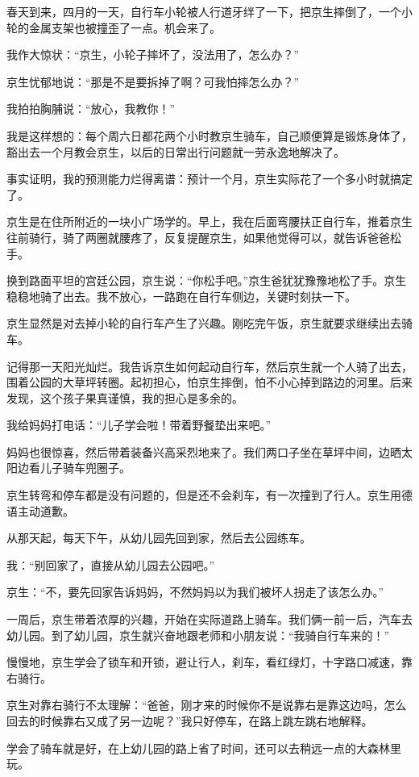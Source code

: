 \documentclass[twoside,openright,headings=optiontohead]{ctexbook} %
\begin{document}
{春天到来，四月的一天，自行车小轮被人行道牙绊了一下，把京生摔倒了，一个小轮的金属支架也被撞歪了一点。机会来了。

我作大惊状：``京生，小轮子摔坏了，没法用了，怎么办？''

京生忧郁地说：``那是不是要拆掉了啊？可我怕摔怎么办？''

我拍拍胸脯说：``放心，我教你！''

我是这样想的：每个周六日都花两个小时教京生骑车，自己顺便算是锻炼身体了，豁出去一个月教会京生，以后的日常出行问题就一劳永逸地解决了。

事实证明，我的预测能力烂得离谱：预计一个月，京生实际花了一个多小时就搞定了。

京生是在住所附近的一块小广场学的。早上，我在后面弯腰扶正自行车，推着京生往前骑行，骑了两圈就腰疼了，反复提醒京生，如果他觉得可以，就告诉爸爸松手。

换到路面平坦的宫廷公园，京生说：``你松手吧。''京生爸犹犹豫豫地松了手。京生稳稳地骑了出去。我不放心，一路跑在自行车侧边，关键时刻扶一下。

京生显然是对去掉小轮的自行车产生了兴趣。刚吃完午饭，京生就要求继续出去骑车。

记得那一天阳光灿烂。我告诉京生如何起动自行车，然后京生就一个人骑了出去，围着公园的大草坪转圈。起初担心，怕京生摔倒，怕不小心掉到路边的河里。后来发现，这个孩子果真谨慎，我的担心是多余的。

我给妈妈打电话：``儿子学会啦！带着野餐垫出来吧。''

妈妈也很惊喜，然后带着装备兴高采烈地来了。我们两口子坐在草坪中间，边晒太阳边看儿子骑车兜圈子。

京生转弯和停车都是没有问题的，但是还不会刹车，有一次撞到了行人。京生用德语主动道歉。

从那天起，每天下午，从幼儿园先回到家，然后去公园练车。

我：``别回家了，直接从幼儿园去公园吧。''

京生：``不，要先回家告诉妈妈，不然妈妈以为我们被坏人拐走了该怎么办。''

一周后，京生带着浓厚的兴趣，开始在实际道路上骑车。我们俩一前一后，汽车去幼儿园。到了幼儿园，京生就兴奋地跟老师和小朋友说：``我骑自行车来的！''

慢慢地，京生学会了锁车和开锁，避让行人，刹车，看红绿灯，十字路口减速，靠右骑行。

京生对靠右骑行不太理解：``爸爸，刚才来的时候你不是说靠右是靠这边吗，怎么回去的时候靠右又成了另一边呢？''我只好停车，在路上跳左跳右地解释。

学会了骑车就是好，在上幼儿园的路上省了时间，还可以去稍远一点的大森林里玩。

}
\end{document}
